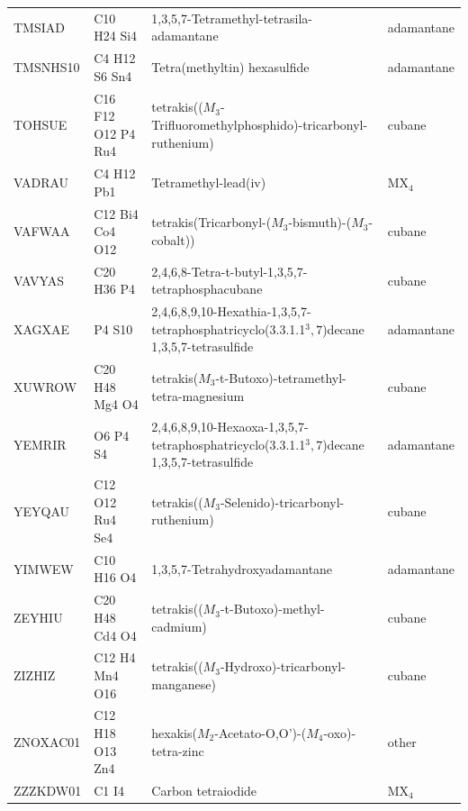 \documentclass[preprint]{revtex4}              %
\begin{document}
\begin{landscape}
\begin{table}
\begin{tabular}{llll}
TMSIAD & C10 H24 Si4 & 1,3,5,7-Tetramethyl-tetrasila-adamantane & adamantane\\
TMSNHS10 & C4 H12 S6 Sn4 & Tetra(methyltin) hexasulfide & adamantane\\
TOHSUE & C16 F12 O12 P4 Ru4 & tetrakis(($M_3$-Trifluoromethylphosphido)-tricarbonyl-ruthenium) & cubane\\
VADRAU & C4 H12 Pb1 & Tetramethyl-lead(iv) & MX$_4$\\
VAFWAA & C12 Bi4 Co4 O12 & tetrakis(Tricarbonyl-($M_3$-bismuth)-($M_3$-cobalt)) & cubane\\
VAVYAS & C20 H36 P4 & 2,4,6,8-Tetra-t-butyl-1,3,5,7-tetraphosphacubane & cubane\\
XAGXAE & P4 S10 & 2,4,6,8,9,10-Hexathia-1,3,5,7-tetraphosphatricyclo(3.3.1.1$^3,7$)decane 1,3,5,7-tetrasulfide & adamantane\\
XUWROW & C20 H48 Mg4 O4 & tetrakis($M_3$-t-Butoxo)-tetramethyl-tetra-magnesium & cubane\\
YEMRIR & O6 P4 S4 & 2,4,6,8,9,10-Hexaoxa-1,3,5,7-tetraphosphatricyclo(3.3.1.1$^3,7$)decane 1,3,5,7-tetrasulfide & adamantane\\
YEYQAU & C12 O12 Ru4 Se4 & tetrakis(($M_3$-Selenido)-tricarbonyl-ruthenium) & cubane\\
YIMWEW & C10 H16 O4 & 1,3,5,7-Tetrahydroxyadamantane & adamantane\\
ZEYHIU & C20 H48 Cd4 O4 & tetrakis(($M_3$-t-Butoxo)-methyl-cadmium) & cubane\\
ZIZHIZ & C12 H4 Mn4 O16 & tetrakis(($M_3$-Hydroxo)-tricarbonyl-manganese) & cubane\\
ZNOXAC01 & C12 H18 O13 Zn4 & hexakis($M_2$-Acetato-O,O')-($M_4$-oxo)-tetra-zinc & other\\
ZZZKDW01 & C1 I4 & Carbon tetraiodide & MX$_4$\\
\hline
\end{tabular}
\end{table}
\end{landscape}
\end{document}
